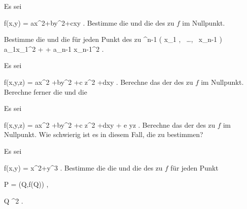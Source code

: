 \setcounter{section}{5}


{}
{

Es sei

\mavergleichskettedisp
{\vergleichskette
{ f(x,y)
}
{ =} { ax^2+by^2+cxy
}
{ } {
}
{ } {
}
{ } {
}
}
{}{}{.}
Bestimme die
und die
des
zu $f$ im Nullpunkt.

}
{} {}

{}
{

Bestimme die
und die
für jeden Punkt des
zu
 {\R^{n-1}} {\R
} { \left(  x_1   , \,   \ldots  , \,   x_{n-1}                 \right) } { a_1x_1^2  + \cdots + a_{n-1} x_{n-1}^2
} {.}

}
{} {}

{}
{

Es sei

\mavergleichskettedisp
{\vergleichskette
{ f(x,y,z)
}
{ =} { ax^2 +by^2 +c z^2 +dxy
}
{ } {
}
{ } {
}
{ } {
}
}
{}{}{.}
Berechne das
der
des
zu $f$ im Nullpunkt. Berechne ferner die
und die

}
{} {}

{}
{

Es sei

\mavergleichskettedisp
{\vergleichskette
{ f(x,y,z)
}
{ =} { ax^2 +by^2 +c z^2 +dxy + e yz
}
{ } {
}
{ } {
}
{ } {
}
}
{}{}{.}
Berechne das
der
des
zu $f$ im Nullpunkt. Wie schwierig ist es in diesem Fall, die
zu bestimmen?

}
{} {}

{}
{

Es sei

\mavergleichskettedisp
{\vergleichskette
{ f(x,y)
}
{ =} { x^2+y^3
}
{ } {
}
{ } {
}
{ } {
}
}
{}{}{.}
Bestimme die
die
und die
des
zu $f$ für jeden Punkt

\mavergleichskette
{\vergleichskette
{ P
}
{ = }{ (Q,f(Q))
}
{  }{
}
{    }{
}
{   }{
}
}
{}{}{,}

\mavergleichskette
{\vergleichskette
{ Q
}
{ \in }{ \R^2
}
{  }{
}
{    }{
}
{   }{
}
}
{}{}{.}

}
{} {}

